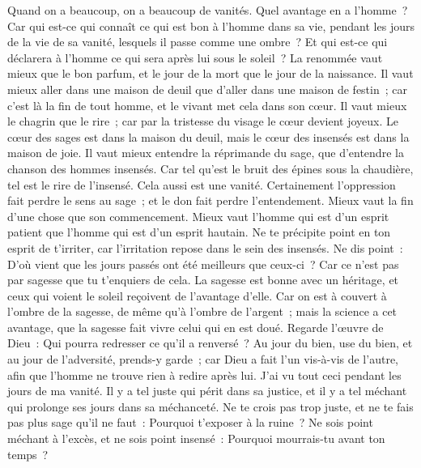 \begin{multicols}{2}
Quand on a beaucoup, on a beaucoup de vanités. Quel avantage en a l'homme~? 
Car qui est-ce qui connaît ce qui est bon à l'homme dans sa vie, pendant les jours de la vie de sa vanité, lesquels il passe comme une ombre~? Et qui est-ce qui déclarera à l'homme ce qui sera après lui sous le soleil~?
\VerseOne{}La renommée vaut mieux que le bon parfum, et le jour de la mort que le jour de la naissance.
Il vaut mieux aller dans une maison de deuil que d'aller dans une maison de festin~; car c'est là la fin de tout homme, et le vivant met cela dans son cœur.
Il vaut mieux le chagrin que le rire~; car par la tristesse du visage le cœur devient joyeux.
Le cœur des sages est dans la maison du deuil, mais le cœur des insensés est dans la maison de joie.
Il vaut mieux entendre la réprimande du sage, que d'entendre la chanson des hommes insensés.
Car tel qu'est le bruit des épines sous la chaudière, tel est le rire de l'insensé. Cela aussi est une vanité. 
Certainement l'oppression fait perdre le sens au sage~; et le don fait perdre l'entendement. 
Mieux vaut la fin d'une chose que son commencement. Mieux vaut l'homme qui est d'un esprit patient que l'homme qui est d'un esprit hautain. 
Ne te précipite point en ton esprit de t'irriter, car l'irritation repose dans le sein des insensés.
Ne dis point~: D'où vient que les jours passés ont été meilleurs que ceux-ci~? Car ce n'est pas par sagesse que tu t'enquiers de cela. 
La sagesse est bonne avec un héritage, et ceux qui voient le soleil reçoivent de l'avantage d'elle.
Car on est à couvert à l'ombre de la sagesse, de même qu'à l'ombre de l'argent~; mais la science a cet avantage, que la sagesse fait vivre celui qui en est doué. 
Regarde l'œuvre de Dieu~: Qui pourra redresser ce qu'il a renversé~?
Au jour du bien, use du bien, et au jour de l'adversité, prends-y garde~; car Dieu a fait l'un vis-à-vis de l'autre, afin que l'homme ne trouve rien à redire après lui. 
J'ai vu tout ceci pendant les jours de ma vanité. Il y a tel juste qui périt dans sa justice, et il y a tel méchant qui prolonge ses jours dans sa méchanceté.
Ne te crois pas trop juste, et ne te fais pas plus sage qu'il ne faut~: Pourquoi t'exposer à la ruine~?
Ne sois point méchant à l'excès, et ne sois point insensé~: Pourquoi mourrais-tu avant ton temps~?

\end{multicols}
